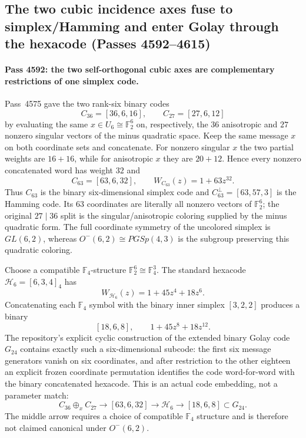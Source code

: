 \subsection{The two cubic incidence axes fuse to simplex/Hamming and enter Golay through the hexacode (Passes 4592--4615)}
\label{sec:pass4592-4615-paired-axes-golay}

\paragraph{Pass 4592: the two self-orthogonal cubic axes are complementary restrictions of one simplex code.}
Pass~4575 gave the two rank-six binary codes
\[
 C_{36}=[36,6,16],\qquad C_{27}=[27,6,12]
\]
by evaluating the same $x\in U_6\cong\mathbb F_2^6$ on, respectively, the
$36$ anisotropic and $27$ nonzero singular vectors of the minus quadratic
space.  Keep the same message $x$ on both coordinate sets and concatenate.
For nonzero singular $x$ the two partial weights are $16+16$, while for
anisotropic $x$ they are $20+12$.  Hence every nonzero concatenated word has
weight $32$ and
\[
 \boxed{C_{63}=[63,6,32],\qquad W_{C_{63}}(z)=1+63z^{32}.}
\]
Thus $C_{63}$ is the binary six-dimensional simplex code and
$C_{63}^{\perp}=[63,57,3]$ is the Hamming code.  Its $63$ coordinates are
literally all nonzero vectors of $\mathbb F_2^6$; the original $27\mid36$
split is the singular/anisotropic coloring supplied by the minus quadratic form.
The full coordinate symmetry of the uncolored simplex is $GL(6,2)$, whereas
$O^-(6,2)\cong PGSp(4,3)$ is the subgroup preserving this quadratic coloring.

Choose a compatible $\mathbb F_4$-structure
$\mathbb F_2^6\cong\mathbb F_4^3$.  The standard hexacode
$\mathcal H_6=[6,3,4]_{4}$ has
\[
 W_{\mathcal H_6}(z)=1+45z^4+18z^6.
\]
Concatenating each $\mathbb F_4$ symbol with the binary inner simplex
$[3,2,2]$ produces a binary
\[
 \boxed{[18,6,8],\qquad 1+45z^8+18z^{12}.}
\]
The repository's explicit cyclic construction of the extended binary Golay
code $G_{24}$ contains exactly such a six-dimensional subcode: the first six
message generators vanish on six coordinates, and after restriction to the
other eighteen an explicit frozen coordinate permutation identifies the code
word-for-word with the binary concatenated hexacode.  This is an actual code
embedding, not a parameter match:
\[
 C_{36}\oplus_x C_{27}
 \longrightarrow [63,6,32]
 \longrightarrow \mathcal H_6
 \longrightarrow [18,6,8]\subset G_{24}.
\]
The middle arrow requires a choice of compatible $\mathbb F_4$ structure and is
therefore not claimed canonical under $O^-(6,2)$.

